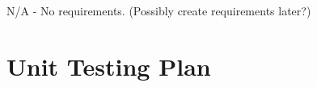 \documentclass[12pt, titlepage]{article}
\begin{document}
N/A - No requirements. (Possibly create requirements later?)


		



					
					
					
					
					

					
					
					
					



				
\section{Unit Testing Plan}
		
\end{document}
